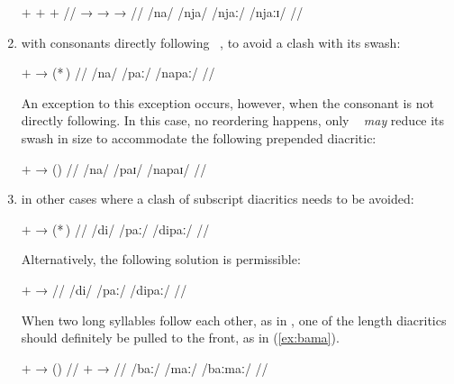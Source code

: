 \begin{enumerate}
	\ex[lingstyle=thex,everygla=\normalsize,everyglb=\upshape\Large,
		aboveglcskip=0.5em,numoffset=\leftmargin]
	\begingl
		\gla {} {$+$ } {} {$+$ } {} {$+$ } 
			{} //
		\glb {} →  →  →  //
		\glc /na/ {} /nja/ {} /njaː/ {} /njaːɪ/ //
	\endgl\xe

\item with consonants directly following ~, to avoid a clash 
	with its swash:
	
	\ex[lingstyle=thex,numoffset=\leftmargin]
	\begingl
		\gla {} $+$  →  \quad
			(*\,) //
		\glb /na/ {} /paː/ {} /napaː/ {} {} //
	\endgl\xe
	
	An exception to this exception occurs, however, when the consonant is 
	not directly following. In this case, no reordering happens, only 
	~ \emph{may} reduce its swash in size to accommodate 
	the following prepended diacritic:
	
	\pex[lingstyle=thex,numoffset=\leftmargin]
	\begingl
		\gla {} $+$  →  \quad
			(\ques{}) //
		\glb /na/ {} /paɪ/ {} /napaɪ/ {} {} //
	\endgl\xe
	
\item in other cases where a clash of subscript diacritics needs to be avoided:

	\ex[lingstyle=thex,numoffset=\leftmargin]
	\begingl
		\gla {} $+$  →  \quad 
			(*\,) //
		\glb /di/ {} /paː/ {} /dipaː/ {} {} //
	\endgl\xe
	
	Alternatively, the following solution is permissible:
	
	\ex[lingstyle=thex,numoffset=\leftmargin]%
	\begingl
		\gla {} $+$  → 
		 //
		\glb /di/ {} /paː/ {} /dipaː/ //
	\endgl\xe
	
	When two long syllables follow each other, as in 
	, one of the length diacritics should 
	definitely be pulled to the front, as in (\ref{ex:bama}).
	
	\ex[lingstyle=thex,everyglb=\upshape\Large,aboveglcskip=0.5em,
	numoffset=\leftmargin]\label{ex:bama}
	\begingl
		\gla {}  $+$  →  \quad 
			(\ques{}) //
		  $+$  → 
			 //
		\glc {} /baː/ {} /maː/ {} /baːmaː/ //
	\endgl
	\xe

\end{enumerate}

